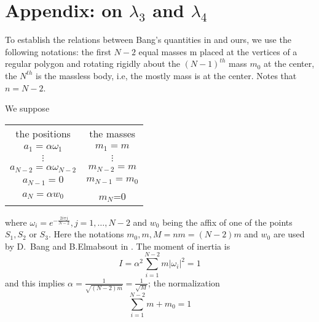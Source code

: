\documentclass[11pt]{article}
\begin{document}
\appendix
\setcounter{equation}{0}
\section{Appendix: on 
    \texorpdfstring{$\lambda_3$}{lambda\_3} and 
    \texorpdfstring{$\lambda_4$}{lambda\_4}}\label{sec:5}

To establish the relations between Bang's quantities in \cite{BaE}
and ours, we use the following notations:
the first $N-2$ equal masses m placed at the vertices of a regular polygon and rotating rigidly about the  $(N-1)^{th}$ mass $m_0$ at the center, the $N^{th}$ is the massless body, i.e, the mostly mass is at the center.
Notes that $n=N-2$.

We suppose
 \begin{center}
 	\begin{tabular}{c c}
 		the positions & the masses\\
 		$a_{1}=\alpha \omega_{1}$                        &$m_1=m$\\
 		$\vdots$                                       &$\vdots$\\
 		$a_{N-2}=\alpha \omega_{N-2}$               &$m_{N-2}=m$\\
 		$a_{N-1}=0$                                 &$m_{N-1}=m_0$\\
 		$a_{N}=\alpha w_{0}$                        &$m_{N}$=0
 	\end{tabular}
 \end{center}
 where $\omega_i=e^{-\frac{2i\pi j}{N-2}}, j=1, \ldots , N-2$
 and $w_0$ being the affix of one of the points $S_1,S_2$
 or $S_3$.
Here the notations $m_0, m ,M=nm=(N-2)m$ and $w_0$ are used by
D.~Bang and B.Elmabsout in \cite{BaE}.
 The moment of inertia is
 \begin{displaymath}
 I=\alpha^{2}
 \sum_{i=1}^{N-2}m|\omega_i|^2=1
 \end{displaymath}
 and this implies $\alpha =\frac{1}{\sqrt{(N-2)m}}=\frac{1}{\sqrt{M}}$;
 the normalization $$\sum_{i=1}^{N-2}m+m_0=1$$
 
\end{document}
